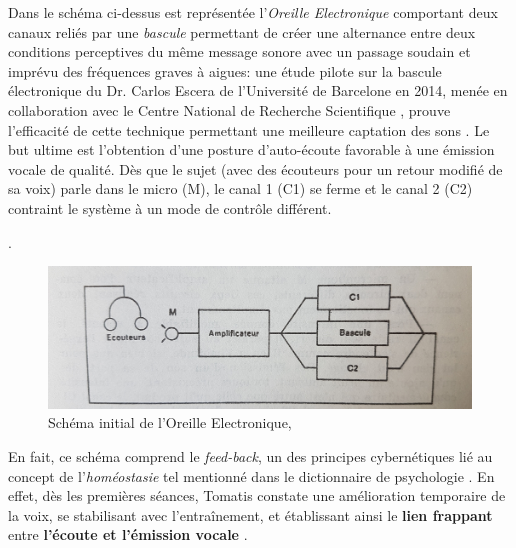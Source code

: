 Dans le schéma ci-dessus est représentée l'\textit{Oreille Electronique}
comportant deux canaux reliés par une
\textit{bascule}  permettant de créer une alternance entre deux conditions perceptives du même message sonore avec un passage soudain et imprévu des fréquences graves à aigues: une étude pilote sur la bascule électronique du Dr. Carlos Escera
de l'Université de Barcelone en 2014, menée en collaboration avec le
Centre National de Recherche Scientifique \autocite{escera-key}, prouve l'efficacité de cette technique permettant
une meilleure
captation des sons \href {http://tomatisassociation.org/scientific-validation-of-the-tomatis-effect-
eeg-recordings-of-sound-from-brainstem-to-cerebral-cortex-encoding-university-of
-barcelona-2014/} \autocite {tomatisassociation.org}.
Le but ultime est l'obtention d'une posture d'auto-écoute favorable à une
          émission vocale de qualité.
Dès que le sujet (avec
des écouteurs pour un retour modifié de sa voix) parle
dans le micro (M), le canal 1 (C1) se ferme et  le canal 2 (C2) contraint le
système à un mode de contrôle différent.

.
\begin{figure}
	\centering
	\includegraphics[width=0.7\linewidth]{images/oreilleelectro.jpg}
	\caption[L'Oreille
          Electronique: schéma]{Schéma initial de l'Oreille
          Electronique,\autocite[p.~97] {tomatisoreilletvie}}
\label{oreilleelectro}
\end{figure}
En fait, ce schéma comprend le\textit{ feed-back}, un des principes
cybernétiques lié au concept de l'\textit{homéostasie} tel
mentionné dans le dictionnaire de
psychologie \autocite[298]{doronparot}.
En effet, dès les premières
séances, Tomatis constate une amélioration temporaire de la voix, se
stabilisant avec l'entraînement, et établissant ainsi le
\textbf{lien frappant} entre\textbf{ l'écoute et
  l'émission vocale} \autocite {tomatisoreilletvie}.

